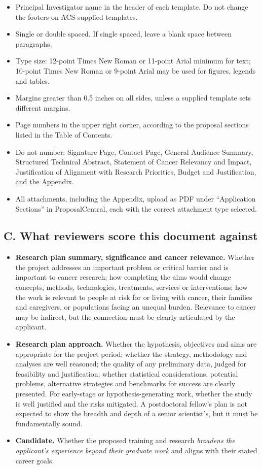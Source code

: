 \documentclass[12pt,letterpaper]{article}
\begin{document}
\begin{itemize}
\item Principal Investigator name in the header of each template. Do not change
  the footers on ACS-supplied templates.
\item Single or double spaced. If single spaced, leave a blank space between
  paragraphs.
\item Type size: 12-point Times New Roman or 11-point Arial minimum for text;
  10-point Times New Roman or 9-point Arial may be used for figures, legends
  and tables.
\item Margins greater than 0.5 inches on all sides, unless a supplied template
  sets different margins.
\item Page numbers in the upper right corner, according to the proposal
  sections listed in the Table of Contents.
\item Do not number: Signature Page, Contact Page, General Audience Summary,
  Structured Technical Abstract, Statement of Cancer Relevancy and Impact,
  Justification of Alignment with Research Priorities, Budget and
  Justification, and the Appendix.
\item All attachments, including the Appendix, upload as PDF under
  ``Application Sections'' in ProposalCentral, each with the correct attachment
  type selected.
\end{itemize}

\subsection*{C. What reviewers score this document against}

\begin{itemize}
\item \textbf{Research plan summary, significance and cancer relevance.}
  Whether the project addresses an important problem or critical barrier and is
  important to cancer research; how completing the aims would change concepts,
  methods, technologies, treatments, services or interventions; how the work is
  relevant to people at risk for or living with cancer, their families and
  caregivers, or populations facing an unequal burden. Relevance to cancer may
  be indirect, but the connection must be clearly articulated by the applicant.
\item \textbf{Research plan approach.} Whether the hypothesis, objectives and
  aims are appropriate for the project period; whether the strategy,
  methodology and analyses are well reasoned; the quality of any preliminary
  data, judged for feasibility and justification; whether statistical
  considerations, potential problems, alternative strategies and benchmarks for
  success are clearly presented. For early-stage or hypothesis-generating work,
  whether the study is well justified and the risks mitigated. A postdoctoral
  fellow's plan is not expected to show the breadth and depth of a senior
  scientist's, but it must be fundamentally sound.
\item \textbf{Candidate.} Whether the proposed training and research
  \emph{broadens the applicant's experience beyond their graduate work} and
  aligns with their stated career goals.
\end{itemize}
\end{document}
